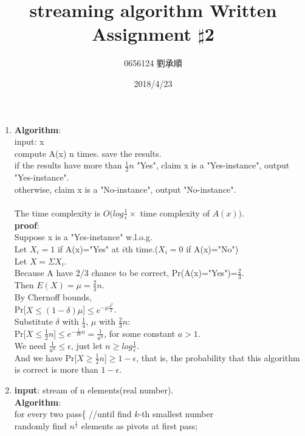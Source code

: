 \documentclass[11pt]{article}
\title{streaming algorithm Written Assignment $\sharp$2 }
\author{0656124 劉承順}
\date{2018/4/23} %
\begin{document}
\maketitle





\begin{enumerate}
\item 
\textbf{Algorithm}: \\
input: x \\
compute A(x) n times. save the results. \\
if the results have more than $\frac{1}{2}n$ "Yes", claim x is a "Yes-instance", output "Yes-instance". \\
otherwise,  claim x is a "No-instance", output "No-instance". \\
 \\
The time complexity is $O(log \frac{1}{\epsilon} \times$ time complexity of $A(x) )$. \\
\textbf{proof}: \\
Suppose x is a "Yes-instance" w.l.o.g. \\
Let $X_i=1$ if A(x)="Yes" at $i$th time.($X_i=0$ if A(x)="No") \\
Let $X=\Sigma X_i$. \\
Because A have 2/3 chance to be correct, Pr(A(x)="Yes")=$\frac{2}{3}$. \\
Then $E(X)=\mu=\frac{2}{3}n$. \\
By Chernoff bounds, \\
Pr[$X\leq (1-\delta)\mu$]$\leq e^{-\mu\frac{\delta^2}{2}}$. \\
Substitute $\delta$ with $\frac{1}{4}$, $\mu$ with $\frac{2}{3}n$: \\
Pr[$X\leq \frac{1}{2}n$]$\leq e^{-\frac{1}{48}n} = \frac{1}{a^n}$, for some constant $a>1$. \\
We need $\frac{1}{a^n}\leq\epsilon$, just let $n\geq log \frac{1}{\epsilon}$. \\
And we have Pr[$X\geq \frac{1}{2}n$]$\geq 1-\epsilon$, that is, the probability that this algorithm is correct is more than $1-\epsilon$. \\



\item 
\textbf{input}: stream of n elements(real number). \\
\textbf{Algorithm}: \\

for every two pass\{  //until find $k$-th smallest number\\
randomly find $n^{\frac{1}{c}}$ elements as pivots at first pass; \\


\end{enumerate}
\end{document}
